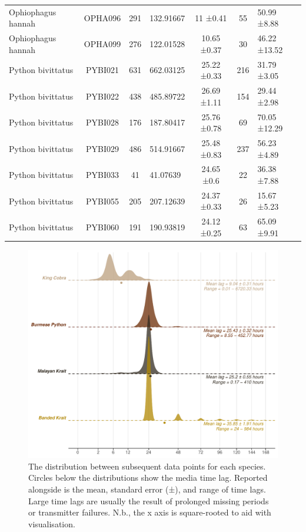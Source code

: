 \documentclass[10pt,a4paper]{article}
\begin{document}
\begin{table}[!h]
{\begin{tabular}[t]{lcclccl}
Ophiophagus hannah & OPHA096 & 291 & 132.91667 & 11 ±0.41 & 55 & 50.99 ±8.88\\
Ophiophagus hannah & OPHA099 & 276 & 122.01528 & 10.65 ±0.37 & 30 & 46.22 ±13.52\\
Python bivittatus & PYBI021 & 631 & 662.03125 & 25.22 ±0.33 & 216 & 31.79 ±3.05\\
Python bivittatus & PYBI022 & 438 & 485.89722 & 26.69 ±1.11 & 154 & 29.44 ±2.98\\
Python bivittatus & PYBI028 & 176 & 187.80417 & 25.76 ±0.78 & 69 & 70.05 ±12.29\\
Python bivittatus & PYBI029 & 486 & 514.91667 & 25.48 ±0.83 & 237 & 56.23 ±4.89\\
Python bivittatus & PYBI033 & 41 & 41.07639 & 24.65 ±0.6 & 22 & 36.38 ±7.88\\
Python bivittatus & PYBI055 & 205 & 207.12639 & 24.37 ±0.33 & 26 & 15.67 ±5.23\\
Python bivittatus & PYBI060 & 191 & 190.93819 & 24.12 ±0.25 & 63 & 65.09 ±9.91\\

\end{tabular}}
\end{table}

\begin{figure}[h]
\includegraphics[width=1\linewidth]{../../figures/timeLagPlot} \caption{The distribution between subsequent data points for each species. Circles below the distributions show the media time lag. Reported alongside is the mean, standard error (±), and range of time lags. Large time lags are usually the result of prolonged missing periods or transmitter failures. N.b., the x axis is square-rooted to aid with visualisation.}\label{fig:timeLagPlot}
\end{figure}
\end{document}
